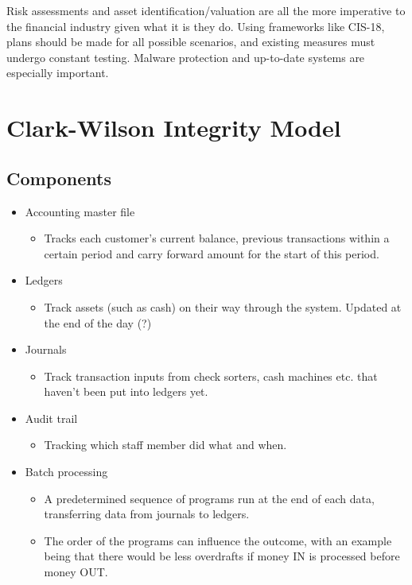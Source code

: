\documentclass[12pt]{report}
\begin{document}
\noindent Risk assessments and asset identification/valuation are all the more imperative to the financial industry given what it is they do. 
Using frameworks like CIS-18, plans should be made for all possible scenarios, and existing measures must undergo constant testing.
Malware protection and up-to-date systems are especially important.

\pagebreak 

\section{Clark-Wilson Integrity Model}
\subsection{Components}
\begin{itemize}
	\item Accounting master file
	\begin{itemize}
		\item Tracks each customer's current balance, previous transactions within a certain period and carry forward amount for the start of this period.
	\end{itemize}
	\item Ledgers
	\begin{itemize}
		\item Track assets (such as cash) on their way through the system. Updated at the end of the day (?)
	\end{itemize}
	\item Journals
	\begin{itemize}
		\item Track transaction inputs from check sorters, cash machines etc. that haven't been put into ledgers yet.
	\end{itemize}
	\item Audit trail
	\begin{itemize}
		\item Tracking which staff member did what and when.
	\end{itemize}
	\item Batch processing
	\begin{itemize}
		\item A predetermined sequence of programs run at the end of each data, transferring data from journals to ledgers.
		\item The order of the programs can influence the outcome, with an example being that there would be less overdrafts if money IN is processed before money OUT.

\end{itemize}
\end{itemize}
\end{document}
